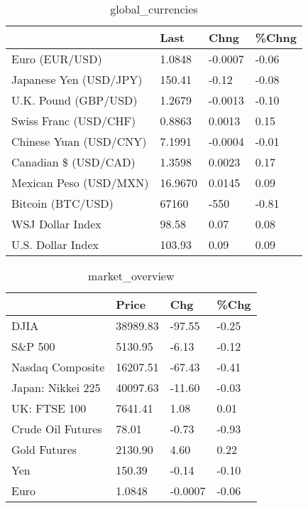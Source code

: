 \documentclass{article}%
\begin{document}
%


\begin{table}[htbp]%
\caption{global\_currencies}%
\centering%
\begin{adjustbox}{width=1\textwidth}%
\begin{tabular}{llll}
\toprule
                       &    Last &    Chng & \%Chng \\
\midrule
        Euro (EUR/USD) &  1.0848 & -0.0007 & -0.06 \\
Japanese Yen (USD/JPY) &  150.41 &   -0.12 & -0.08 \\
  U.K. Pound (GBP/USD) &  1.2679 & -0.0013 & -0.10 \\
 Swiss Franc (USD/CHF) &  0.8863 &  0.0013 &  0.15 \\
Chinese Yuan (USD/CNY) &  7.1991 & -0.0004 & -0.01 \\
  Canadian \$ (USD/CAD) &  1.3598 &  0.0023 &  0.17 \\
Mexican Peso (USD/MXN) & 16.9670 &  0.0145 &  0.09 \\
     Bitcoin (BTC/USD) &   67160 &    -550 & -0.81 \\
      WSJ Dollar Index &   98.58 &    0.07 &  0.08 \\
     U.S. Dollar Index &  103.93 &    0.09 &  0.09 \\
\bottomrule
\end{tabular}
%
\end{adjustbox}%
\end{table}

%


\begin{table}[htbp]%
\caption{market\_overview}%
\centering%
\begin{adjustbox}{width=1\textwidth}%
\begin{tabular}{llll}
\toprule
                  &    Price &     Chg &  \%Chg \\
\midrule
             DJIA & 38989.83 &  -97.55 & -0.25 \\
          S\&P 500 &  5130.95 &   -6.13 & -0.12 \\
 Nasdaq Composite & 16207.51 &  -67.43 & -0.41 \\
Japan: Nikkei 225 & 40097.63 &  -11.60 & -0.03 \\
     UK: FTSE 100 &  7641.41 &    1.08 &  0.01 \\
Crude Oil Futures &    78.01 &   -0.73 & -0.93 \\
     Gold Futures &  2130.90 &    4.60 &  0.22 \\
              Yen &   150.39 &   -0.14 & -0.10 \\
             Euro &   1.0848 & -0.0007 & -0.06 \\
\bottomrule
\end{tabular}
%
\end{adjustbox}%
\end{table}

%
\end{document}
